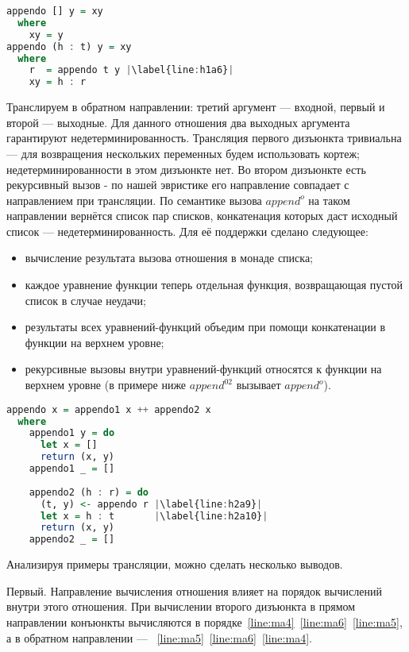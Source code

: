 \documentclass[conference]{IEEEtran}
\begin{document}
\begin{lstlisting}[language=Haskell, frame=single, escapechar=|]
appendo [] y = xy
  where
    xy = y
appendo (h : t) y = xy
  where
    r  = appendo t y |\label{line:h1a6}|
    xy = h : r
\end{lstlisting}

Транслируем в обратном направлении: третий аргумент --- входной, первый и второй --- выходные.
Для данного отношения два выходных аргумента гарантируют недетерминированность.
Трансляция первого дизъюнкта тривиальна --- для возвращения нескольких переменных будем использовать кортеж; недетерминированности в этом дизъюнкте нет.
Во втором дизъюнкте есть рекурсивный вызов - по нашей эвристике его направление совпадает с направлением при трансляции.
По семантике вызова $append^o$ на таком направлении вернётся список пар списков, конкатенация которых даст исходный список --- недетерминированность.
Для её поддержки сделано следующее:
\begin{itemize}
    \item вычисление результата вызова отношения в монаде списка;
    \item каждое уравнение функции теперь отдельная функция, возвращающая пустой список в случае неудачи;
    \item результаты всех уравнений-функций объедим при помощи конкатенации в функции на верхнем уровне;
    \item рекурсивные вызовы внутри уравнений-функций относятся к функции на верхнем уровне (в примере ниже $append^02$ вызывает $append^o$).
\end{itemize}

\begin{lstlisting}[language=Haskell, frame=single, escapechar=|]
appendo x = appendo1 x ++ appendo2 x
  where
    appendo1 y = do
      let x = []
      return (x, y)
    appendo1 _ = []
    
    appendo2 (h : r) = do
      (t, y) <- appendo r |\label{line:h2a9}|
      let x = h : t       |\label{line:h2a10}|
      return (x, y)
    appendo2 _ = []
\end{lstlisting}

Анализируя примеры трансляции, можно сделать несколько выводов.

Первый. Направление вычисления отношения влияет на порядок вычислений внутри этого отношения.
При вычислении второго дизъюнкта в прямом направлении конъюнкты вычисляются в порядке~\ref{line:ma4}~\ref{line:ma6}~\ref{line:ma5}, а в обратном направлении --- ~\ref{line:ma5}~\ref{line:ma6}~\ref{line:ma4}.
\end{document}
